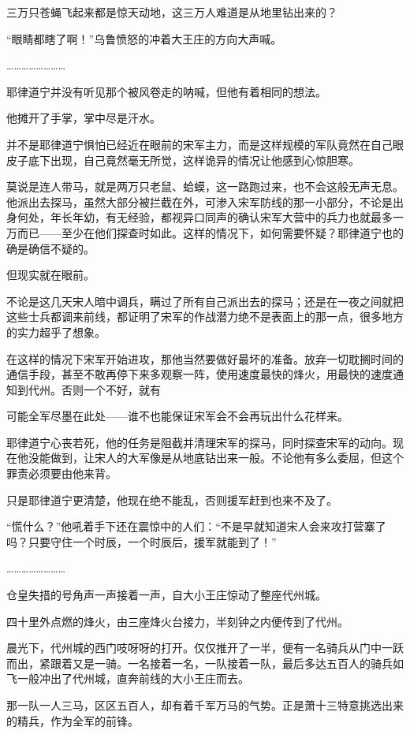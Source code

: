三万只苍蝇飞起来都是惊天动地，这三万人难道是从地里钻出来的？

“眼睛都瞎了啊！”乌鲁愤怒的冲着大王庄的方向大声喊。

……………………

耶律道宁并没有听见那个被风卷走的呐喊，但他有着相同的想法。

他摊开了手掌，掌中尽是汗水。

并不是耶律道宁惧怕已经近在眼前的宋军主力，而是这样规模的军队竟然在自己眼皮子底下出现，自己竟然毫无所觉，这样诡异的情况让他感到心惊胆寒。

莫说是连人带马，就是两万只老鼠、蛤蟆，这一路跑过来，也不会这般无声无息。他派出去探马，虽然大部分被拦截在外，可渗入宋军防线的那一小部分，不论是出身何处，年长年幼，有无经验，都视异口同声的确认宋军大营中的兵力也就最多一万而已——至少在他们探查时如此。这样的情况下，如何需要怀疑？耶律道宁也的确是确信不疑的。

但现实就在眼前。

不论是这几天宋人暗中调兵，瞒过了所有自己派出去的探马；还是在一夜之间就把这些士兵都调来前线，都证明了宋军的作战潜力绝不是表面上的那一点，很多地方的实力超乎了想象。

在这样的情况下宋军开始进攻，那他当然要做好最坏的准备。放弃一切耽搁时间的通信手段，甚至不敢再停下来多观察一阵，使用速度最快的烽火，用最快的速度通知到代州。否则一个不好，就有

可能全军尽墨在此处——谁不也能保证宋军会不会再玩出什么花样来。

耶律道宁心丧若死，他的任务是阻截并清理宋军的探马，同时探查宋军的动向。现在他没能做到，让宋人的大军像是从地底钻出来一般。不论他有多么委屈，但这个罪责必须要由他来背。

只是耶律道宁更清楚，他现在绝不能乱，否则援军赶到也来不及了。

“慌什么？”他吼着手下还在震惊中的人们：“不是早就知道宋人会来攻打营寨了吗？只要守住一个时辰，一个时辰后，援军就能到了！”

……………………

仓皇失措的号角声一声接着一声，自大小王庄惊动了整座代州城。

四十里外点燃的烽火，由三座烽火台接力，半刻钟之内便传到了代州。

晨光下，代州城的西门吱呀呀的打开。仅仅推开了一半，便有一名骑兵从门中一跃而出，紧跟着又是一骑。一名接着一名，一队接着一队，最后多达五百人的骑兵如飞一般冲出了代州城，直奔前线的大小王庄而去。

那一队一人三马，区区五百人，却有着千军万马的气势。正是萧十三特意挑选出来的精兵，作为全军的前锋。


